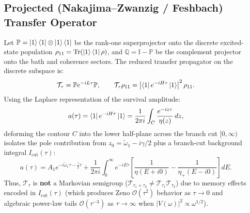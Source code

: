 \documentclass[11pt,a4paper]{article}
\begin{document}
\subsection{Projected (Nakajima--Zwanzig / Feshbach) Transfer Operator}
Let $\mathbb{P} = \ket{1}\bra{1} \otimes \ket{1}\bra{1}$ be the rank-one superprojector onto the discrete excited-state population $\rho_{11} = \operatorname{Tr}(\ket{1}\bra{1}\rho)$, and $\mathbb{Q} = \mathbb{I} - \mathbb{P}$ be the complement projector onto the bath and coherence sectors. The reduced transfer propagator on the discrete subspace is:
\begin{equation}
\mathcal{T}_\tau = \mathbb{P} e^{-iL\tau} \mathbb{P}, \qquad \mathcal{T}_\tau \rho_{11} = \left| \bra{1} e^{-iH\tau} \ket{1} \right|^2 \rho_{11}.
\end{equation}
Using the Laplace representation of the survival amplitude:
\begin{equation}
a(\tau) = \bra{1} e^{-iH\tau} \ket{1} = \frac{1}{2\pi i} \int_{C} \frac{e^{-iz\tau}}{\eta(z)} \, dz,
\end{equation}
deforming the contour $C$ into the lower half-plane across the branch cut $[0, \infty)$ isolates the pole contribution from $z_0 = \tilde{\omega}_1 - i\gamma/2$ plus a branch-cut background integral $I_{\mathrm{cut}}(\tau)$:
\begin{equation}
a(\tau) = A_1 e^{-i\tilde{\omega}_1 \tau - \frac{\gamma}{2}\tau} + \frac{1}{2\pi i} \int_0^\infty e^{-iE\tau} \left[ \frac{1}{\eta(E + i0)} - \frac{1}{\eta_+(E - i0)} \right] dE.
\end{equation}
Thus, $\mathcal{T}_\tau$ is \textbf{not} a Markovian semigroup ($\mathcal{T}_{\tau_1 + \tau_2} \neq \mathcal{T}_{\tau_1}\mathcal{T}_{\tau_2}$) due to memory effects encoded in $I_{\mathrm{cut}}(\tau)$ (which produces Zeno $\mathcal{O}(\tau^2)$ behavior as $\tau \to 0$ and algebraic power-law tails $\mathcal{O}(\tau^{-3})$ as $\tau \to \infty$ when $|V(\omega)|^2 \propto \omega^{1/2}$).
\end{document}
